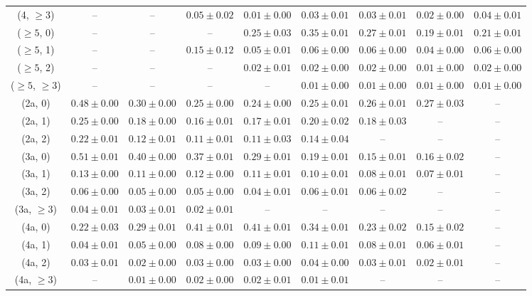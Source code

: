 \begin{table}[h!]
{\begin{tabular}{ccccccccc}
	(4, $\ge3$) & -- & -- & $0.05\pm 0.02$ & $0.01\pm 0.00$ & $0.03\pm 0.01$ & $0.03\pm 0.01$ & $0.02\pm 0.00$ & $0.04\pm 0.01$ \\[0.5ex] 
	($\ge5$, 0) & -- & -- & -- & $0.25\pm 0.03$ & $0.35\pm 0.01$ & $0.27\pm 0.01$ & $0.19\pm 0.01$ & $0.21\pm 0.01$ \\[0.5ex] 
	($\ge5$, 1) & -- & -- & $0.15\pm 0.12$ & $0.05\pm 0.01$ & $0.06\pm 0.00$ & $0.06\pm 0.00$ & $0.04\pm 0.00$ & $0.06\pm 0.00$ \\[0.5ex] 
	($\ge5$, 2) & -- & -- & -- & $0.02\pm 0.01$ & $0.02\pm 0.00$ & $0.02\pm 0.00$ & $0.01\pm 0.00$ & $0.02\pm 0.00$ \\[0.5ex] 
	($\ge5$, $\ge3$) & -- & -- & -- & -- & $0.01\pm 0.00$ & $0.01\pm 0.00$ & $0.01\pm 0.00$ & $0.01\pm 0.00$ \\[0.5ex] 
	(2a, 0) & $0.48\pm 0.00$ & $0.30\pm 0.00$ & $0.25\pm 0.00$ & $0.24\pm 0.00$ & $0.25\pm 0.01$ & $0.26\pm 0.01$ & $0.27\pm 0.03$ & -- \\[0.5ex] 
	(2a, 1) & $0.25\pm 0.00$ & $0.18\pm 0.00$ & $0.16\pm 0.01$ & $0.17\pm 0.01$ & $0.20\pm 0.02$ & $0.18\pm 0.03$ & -- & -- \\[0.5ex] 
	(2a, 2) & $0.22\pm 0.01$ & $0.12\pm 0.01$ & $0.11\pm 0.01$ & $0.11\pm 0.03$ & $0.14\pm 0.04$ & -- & -- & -- \\[0.5ex] 
	(3a, 0) & $0.51\pm 0.01$ & $0.40\pm 0.00$ & $0.37\pm 0.01$ & $0.29\pm 0.01$ & $0.19\pm 0.01$ & $0.15\pm 0.01$ & $0.16\pm 0.02$ & -- \\[0.5ex] 
	(3a, 1) & $0.13\pm 0.00$ & $0.11\pm 0.00$ & $0.12\pm 0.00$ & $0.11\pm 0.01$ & $0.10\pm 0.01$ & $0.08\pm 0.01$ & $0.07\pm 0.01$ & -- \\[0.5ex] 
	(3a, 2) & $0.06\pm 0.00$ & $0.05\pm 0.00$ & $0.05\pm 0.00$ & $0.04\pm 0.01$ & $0.06\pm 0.01$ & $0.06\pm 0.02$ & -- & -- \\[0.5ex] 
	(3a, $\ge3$) & $0.04\pm 0.01$ & $0.03\pm 0.01$ & $0.02\pm 0.01$ & -- & -- & -- & -- & -- \\[0.5ex] 
	(4a, 0) & $0.22\pm 0.03$ & $0.29\pm 0.01$ & $0.41\pm 0.01$ & $0.41\pm 0.01$ & $0.34\pm 0.01$ & $0.23\pm 0.02$ & $0.15\pm 0.02$ & -- \\[0.5ex] 
	(4a, 1) & $0.04\pm 0.01$ & $0.05\pm 0.00$ & $0.08\pm 0.00$ & $0.09\pm 0.00$ & $0.11\pm 0.01$ & $0.08\pm 0.01$ & $0.06\pm 0.01$ & -- \\[0.5ex] 
	(4a, 2) & $0.03\pm 0.01$ & $0.02\pm 0.00$ & $0.03\pm 0.00$ & $0.03\pm 0.00$ & $0.04\pm 0.00$ & $0.03\pm 0.01$ & $0.02\pm 0.01$ & -- \\[0.5ex] 
	(4a, $\ge3$) & -- & $0.01\pm 0.00$ & $0.02\pm 0.00$ & $0.02\pm 0.01$ & $0.01\pm 0.01$ & -- & -- & -- \\[0.5ex] 

\end{tabular}}
\end{table}
